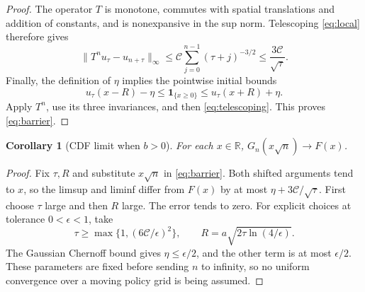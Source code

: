 \documentclass[11pt,a4paper]{article}
\newtheorem{corollary}[theorem]{Corollary}
\newcommand{\R}{\mathbb R}
\begin{document}
\begin{proof}
The operator $T$ is monotone, commutes with spatial translations and
addition of constants, and is nonexpansive in the sup norm. Telescoping
\eqref{eq:local} therefore gives
\begin{equation}\label{eq:telescoping}
\|T^nu_\tau-u_{n+\tau}\|_\infty
\le\mathcal C\sum_{j=0}^{n-1}(\tau+j)^{-3/2}
\le\frac{3\mathcal C}{\sqrt\tau}.
\end{equation}
Finally, the definition of $\eta$ implies the pointwise initial bounds
\[
u_\tau(x-R)-\eta\le\mathbf1_{\{x\ge0\}}
\le u_\tau(x+R)+\eta.
\]
Apply $T^n$, use its three invariances, and then
\eqref{eq:telescoping}. This proves \eqref{eq:barrier}.
\end{proof}

\begin{corollary}[CDF limit when $b>0$]\label{cor:cdf}
For each $x\in\R$, $G_n(x\sqrt n)\to F(x)$.
\end{corollary}
\begin{proof}
Fix $\tau,R$ and substitute $x\sqrt n$ in \eqref{eq:barrier}. Both
shifted arguments tend to $x$, so the limsup and liminf differ from
$F(x)$ by at most $\eta+3\mathcal C/\sqrt\tau$.
First choose $\tau$ large and then $R$ large. The error tends to zero.
For explicit choices at tolerance $0<\epsilon<1$, take
\[
\tau\ge\max\{1,(6\mathcal C/\epsilon)^2\},\qquad
R=a\sqrt{2\tau\ln(4/\epsilon)}.
\]
The Gaussian Chernoff bound gives $\eta\le\epsilon/2$, and the other
term is at most $\epsilon/2$. These parameters are fixed before sending
$n$ to infinity, so no uniform convergence over a moving policy grid
is being assumed.
\end{proof}
\end{document}
